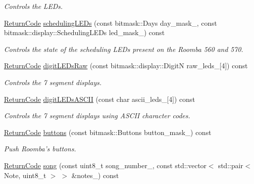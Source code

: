 \begin{DoxyCompactItemize}
\begin{DoxyCompactList}\small\item\em Controls the L\+E\+Ds. \end{DoxyCompactList}\item 
\hyperlink{classroomba_1_1series500_1_1_open_interface_a43fc2ae1216e57cfb46901331b9ab4c7}{Return\+Code} \hyperlink{classroomba_1_1series500_1_1_open_interface_a85c35ebdfac719346777f2d4e8080431}{scheduling\+L\+E\+Ds} (const bitmask\+::\+Days day\+\_\+mask\+\_\+, const bitmask\+::display\+::\+Scheduling\+L\+E\+Ds led\+\_\+mask\+\_\+) const 
\begin{DoxyCompactList}\small\item\em Controls the state of the scheduling L\+E\+Ds present on the Roomba 560 and 570. \end{DoxyCompactList}\item 
\hyperlink{classroomba_1_1series500_1_1_open_interface_a43fc2ae1216e57cfb46901331b9ab4c7}{Return\+Code} \hyperlink{classroomba_1_1series500_1_1_open_interface_a803df2fd6f194189df5c8c10e1048f5a}{digit\+L\+E\+Ds\+Raw} (const bitmask\+::display\+::\+Digit\+N raw\+\_\+leds\+\_\+\mbox{[}4\mbox{]}) const 
\begin{DoxyCompactList}\small\item\em Controls the 7 segment displays. \end{DoxyCompactList}\item 
\hyperlink{classroomba_1_1series500_1_1_open_interface_a43fc2ae1216e57cfb46901331b9ab4c7}{Return\+Code} \hyperlink{classroomba_1_1series500_1_1_open_interface_a64fd0fd3302fbed381f9227914a6095c}{digit\+L\+E\+Ds\+A\+S\+C\+I\+I} (const char ascii\+\_\+leds\+\_\+\mbox{[}4\mbox{]}) const 
\begin{DoxyCompactList}\small\item\em Controls the 7 segment displays using A\+S\+C\+I\+I character codes. \end{DoxyCompactList}\item 
\hyperlink{classroomba_1_1series500_1_1_open_interface_a43fc2ae1216e57cfb46901331b9ab4c7}{Return\+Code} \hyperlink{classroomba_1_1series500_1_1_open_interface_a1f9fcb9cf787c15c7323c0e56755579a}{buttons} (const bitmask\+::\+Buttons button\+\_\+mask\+\_\+) const 
\begin{DoxyCompactList}\small\item\em Push Roomba’s buttons. \end{DoxyCompactList}\item 
\hyperlink{classroomba_1_1series500_1_1_open_interface_a43fc2ae1216e57cfb46901331b9ab4c7}{Return\+Code} \hyperlink{classroomba_1_1series500_1_1_open_interface_a316b270bdf96b6b89c9ecc8a4f7a39bd}{song} (const uint8\+\_\+t song\+\_\+number\+\_\+, const std\+::vector$<$ std\+::pair$<$ Note, uint8\+\_\+t $>$ $>$ \&notes\+\_\+) const 

\end{DoxyCompactItemize}
